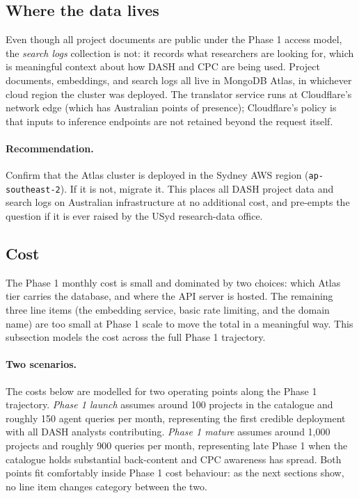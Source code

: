 \documentclass[11pt,a4paper]{article}
\begin{document}
\subsection{Where the data lives}

Even though all project documents are public under the Phase 1 access model, the \emph{search logs} collection is not: it records what researchers are looking for, which is meaningful context about how DASH and CPC are being used. Project documents, embeddings, and search logs all live in MongoDB Atlas, in whichever cloud region the cluster was deployed. The translator service runs at Cloudflare's network edge (which has Australian points of presence); Cloudflare's policy is that inputs to inference endpoints are not retained beyond the request itself.

\paragraph{Recommendation.} Confirm that the Atlas cluster is deployed in the Sydney AWS region (\texttt{ap-southeast-2}). If it is not, migrate it. This places all DASH project data and search logs on Australian infrastructure at no additional cost, and pre-empts the question if it is ever raised by the USyd research-data office.

\subsection{Cost}

The Phase 1 monthly cost is small and dominated by two choices: which Atlas tier carries the database, and where the API server is hosted. The remaining three line items (the embedding service, basic rate limiting, and the domain name) are too small at Phase 1 scale to move the total in a meaningful way. This subsection models the cost across the full Phase 1 trajectory.

\paragraph{Two scenarios.} The costs below are modelled for two operating points along the Phase 1 trajectory. \emph{Phase 1 launch} assumes around 100 projects in the catalogue and roughly 150 agent queries per month, representing the first credible deployment with all DASH analysts contributing. \emph{Phase 1 mature} assumes around 1{,}000 projects and roughly 900 queries per month, representing late Phase 1 when the catalogue holds substantial back-content and CPC awareness has spread. Both points fit comfortably inside Phase 1 cost behaviour: as the next sections show, no line item changes category between the two.
\end{document}
